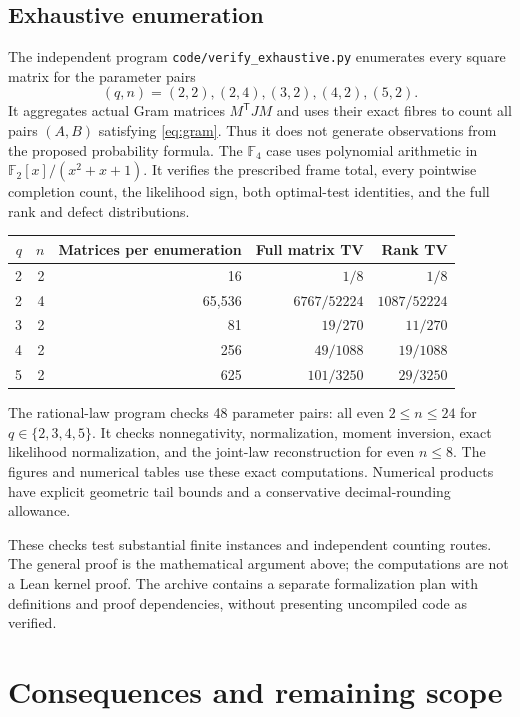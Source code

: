 \documentclass[11pt]{article}
\theoremstyle{definition}\newtheorem{definition}[theorem]{Definition}
\theoremstyle{remark}\newtheorem{remark}[theorem]{Remark}
\newcommand{\F}{\mathbb F}
\newcommand{\1}{\mathbf 1}
\begin{document}
\subsection{Exhaustive enumeration}
The independent program \texttt{code/verify\_exhaustive.py} enumerates
every square matrix for the parameter pairs
\[
 (q,n)=(2,2),(2,4),(3,2),(4,2),(5,2).
\]
It aggregates actual Gram matrices $M^{\mathsf T}JM$ and uses their exact
fibres to count all pairs $(A,B)$ satisfying \eqref{eq:gram}. Thus it
does not generate observations from the proposed probability formula.
The $\F_4$ case uses polynomial arithmetic in
$\F_2[x]/(x^2+x+1)$. It verifies the prescribed frame total, every
pointwise completion count, the likelihood sign, both optimal-test
identities, and the full rank and defect distributions.

\begin{center}
\begin{tabular}{rrrrr}
\toprule
$q$&$n$&Matrices per enumeration&Full matrix TV&Rank TV\\
\midrule
2&2&16&$1/8$&$1/8$\\
2&4&65,536&$6767/52224$&$1087/52224$\\
3&2&81&$19/270$&$11/270$\\
4&2&256&$49/1088$&$19/1088$\\
5&2&625&$101/3250$&$29/3250$\\
\bottomrule
\end{tabular}
\end{center}

The rational-law program checks 48 parameter pairs: all even
$2\le n\le24$ for $q\in\{2,3,4,5\}$. It checks nonnegativity,
normalization, moment inversion, exact likelihood normalization, and
the joint-law reconstruction for even $n\le8$. The figures and numerical
tables use these exact computations. Numerical products have explicit
geometric tail bounds and a conservative decimal-rounding allowance.

These checks test substantial finite instances and independent counting
routes. The general proof is the mathematical argument above; the
computations are not a Lean kernel proof. The archive contains a separate
formalization plan with definitions and proof dependencies, without
presenting uncompiled code as verified.

\section{Consequences and remaining scope}\label{sec:scope}
\end{document}
